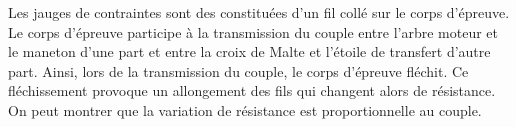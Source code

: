 \documentclass[10pt]{article}
\begin{document}
Les jauges de contraintes sont des constituées d'un fil collé sur le corps d'épreuve. Le corps d'épreuve participe à la transmission du couple entre l'arbre moteur et le maneton d'une part et entre la croix de Malte et l'étoile de transfert d'autre part. Ainsi, lors de la transmission du couple, le corps d'épreuve fléchit. Ce fléchissement provoque un allongement des fils qui changent alors de résistance. On peut montrer que la variation de résistance est proportionnelle au couple. 
\end{document}
